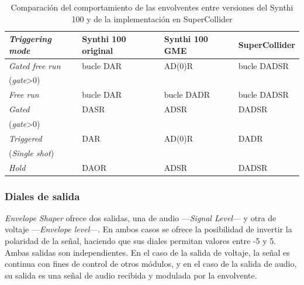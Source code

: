 \begin{table}
	\begin{center}
		\begin{tabular}{ llll }
			\textit{Triggering mode}	& Synthi 100 original	& Synthi 100 GME	& SuperCollider\\
			\hline
			\textit{Gated free run} 	& bucle DAR 		 	& AD(0)R			& bucle DADSR\\
			(\textit{gate}>0)\\ 
			\textit{Free run}			& bucle DAR				& bucle DADR		& bucle DADSR\\
			\textit{Gated}				& DASR					& ADSR				& DADSR\\
			(\textit{gate}>0)\\ 
			\textit{Triggered}			& DAR					& AD(0)R			& DADR\\
			(\textit{Single shot})\\
			\textit{Hold}				& DAOR					& ADSR				& DADSR\\
			
		\end{tabular}
		\caption[Comparación de envolventes del Synthi 100]{Comparación del comportamiento de las envolventes entre versiones del Synthi 100 y de la implementación en SuperCollider}
		\label{table:envolventes}
	\end{center}
\end{table}

\subsubsection{Diales de salida}

\textit{Envelope Shaper} ofrece dos salidas, una de audio ---\textit{Signal Level}--- y otra de voltaje ---\textit{Envelope level}---. En ambos casos se ofrece la posibilidad de invertir la polaridad de la señal, haciendo que sus diales permitan valores entre -5 y 5. Ambas salidas son independientes. En el caso de la salida de voltaje, la señal es continua con fines de control de otros módulos, y en el caso de la salida de audio, su salida es una señal de audio recibida y modulada por la envolvente.
